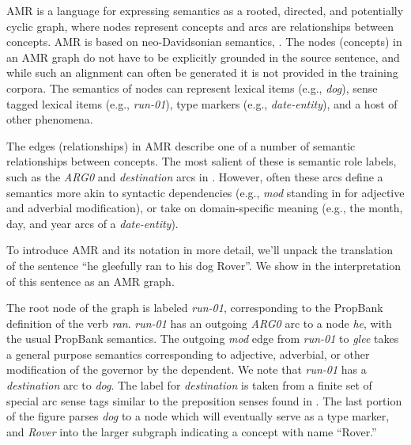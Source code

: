 \documentclass[11pt]{article}
\newcommand\w[1]{\textit{#1}} %
\newcommand\e[1]{\textit{#1}} %
\newcommand\n[1]{\textit{#1}} %
\begin{document}

AMR is a language for expressing semantics as a rooted, directed, and potentially cyclic graph, where nodes represent concepts and arcs are relationships between concepts.
AMR is based on neo-Davidsonian semantics, \cite{Davidson:1967,Parsons:1990}.
The nodes (concepts) in an AMR graph do not have to be explicitly grounded in the source sentence, and while such an alignment can often be generated it is not provided in the training corpora.
The semantics of nodes can represent lexical items (e.g., \w{dog}), sense tagged lexical items (e.g., \textit{run-01}), type markers (e.g., \textit{date-entity}), and a host of other phenomena.

The edges (relationships) in AMR describe one of a number of semantic relationships between concepts.
The most salient of these is semantic role labels, such as the \w{ARG0} and \w{destination} arcs in .
However, often these arcs define a semantics more akin to syntactic dependencies (e.g., \textit{mod} standing in for adjective and adverbial modification), or take on domain-specific meaning (e.g., the month, day, and year arcs of a \textit{date-entity}).

To introduce AMR and its notation in more detail, we'll unpack the translation of the sentence ``he gleefully ran to his dog Rover''. 
We show in  the interpretation of this sentence as an AMR graph.


The root node of the graph is labeled \n{run-01}, corresponding to the PropBank \cite{palmer2005proposition-srl} definition of the verb \w{ran}.
\w{run-01} has an outgoing \e{ARG0} arc to a node \w{he}, with the usual PropBank semantics.
The outgoing \e{mod} edge from \n{run-01} to \n{glee} takes a general purpose semantics corresponding to adjective, adverbial, or other modification of the governor by the dependent.
We note that \n{run-01} has a \e{destination} arc to \n{dog}.
The label for \e{destination} is taken from a finite set of special arc sense tags similar to the preposition senses found in \cite{srikumar2013-srl}.
The last portion of the figure parses \w{dog} to a node which will eventually serve as a type marker, and \w{Rover} into the larger subgraph indicating a concept with name ``Rover.''
\end{document}
